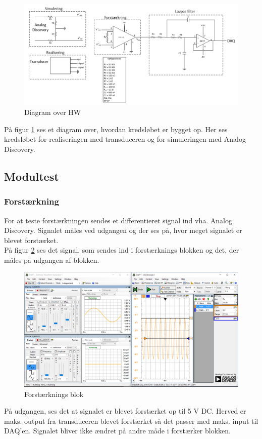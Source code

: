 \begin{figure}[H]
	\centering
	\includegraphics[width=1.0\textwidth]{Figurer/diagram_over_HW}
	\caption{Diagram over HW}
	\label{fig:HW}
\end{figure}

På figur \ref{fig:HW} ses et diagram over, hvordan kredsløbet er bygget op. Her ses kredsløbet for realiseringen med transduceren og for simuleringen med Analog Discovery.

\subsection{Modultest}
\subsubsection{Forstærkning}
For at teste forstærkningen sendes et differentieret signal ind vha. Analog Discovery. Signalet måles ved udgangen og der ses på, hvor meget signalet er blevet forstærket.\\ 
På figur \ref{fig:forstaerkning} ses det signal, som sendes ind i forstærknings blokken og det, der måles på udgangen af blokken. 
\begin{figure}[H]
	\centering
	\includegraphics[width=1.0\textwidth]{Figurer/forst_blok}
	\caption{Forstærknings blok}
	\label{fig:forstaerkning}
\end{figure}
På udgangen, ses det at signalet er blevet forstærket op til 5 V DC. Herved er maks. output fra transduceren blevet forstærket så det passer med maks. input til DAQ'en. Signalet bliver ikke ændret på andre måde i forstærker blokken.

